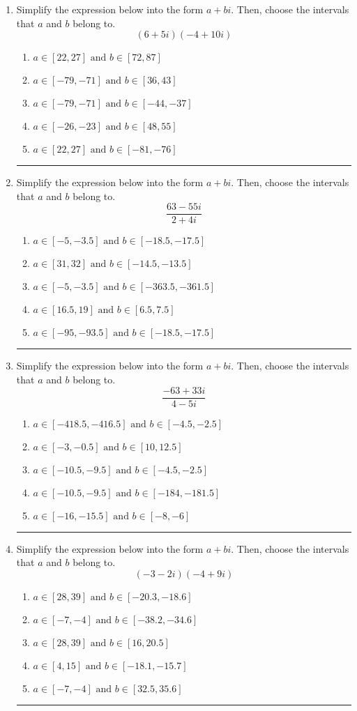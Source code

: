 \documentclass[14pt]{extbook}
\newcommand{\litem}[1]{\item#1\hspace*{-1cm}\rule{\textwidth}{0.4pt}}
\begin{document}
\begin{enumerate}
\litem{
Simplify the expression below into the form $a+bi$. Then, choose the intervals that $a$ and $b$ belong to.\[ (6 + 5 i)(-4 + 10 i) \]\begin{enumerate}[label=\Alph*.]
\item \( a \in [22, 27] \text{ and } b \in [72, 87] \)
\item \( a \in [-79, -71] \text{ and } b \in [36, 43] \)
\item \( a \in [-79, -71] \text{ and } b \in [-44, -37] \)
\item \( a \in [-26, -23] \text{ and } b \in [48, 55] \)
\item \( a \in [22, 27] \text{ and } b \in [-81, -76] \)

\end{enumerate} }
\litem{
Simplify the expression below into the form $a+bi$. Then, choose the intervals that $a$ and $b$ belong to.\[ \frac{63 - 55 i}{2 + 4 i} \]\begin{enumerate}[label=\Alph*.]
\item \( a \in [-5, -3.5] \text{ and } b \in [-18.5, -17.5] \)
\item \( a \in [31, 32] \text{ and } b \in [-14.5, -13.5] \)
\item \( a \in [-5, -3.5] \text{ and } b \in [-363.5, -361.5] \)
\item \( a \in [16.5, 19] \text{ and } b \in [6.5, 7.5] \)
\item \( a \in [-95, -93.5] \text{ and } b \in [-18.5, -17.5] \)

\end{enumerate} }
\litem{
Simplify the expression below into the form $a+bi$. Then, choose the intervals that $a$ and $b$ belong to.\[ \frac{-63 + 33 i}{4 - 5 i} \]\begin{enumerate}[label=\Alph*.]
\item \( a \in [-418.5, -416.5] \text{ and } b \in [-4.5, -2.5] \)
\item \( a \in [-3, -0.5] \text{ and } b \in [10, 12.5] \)
\item \( a \in [-10.5, -9.5] \text{ and } b \in [-4.5, -2.5] \)
\item \( a \in [-10.5, -9.5] \text{ and } b \in [-184, -181.5] \)
\item \( a \in [-16, -15.5] \text{ and } b \in [-8, -6] \)

\end{enumerate} }
\litem{
Simplify the expression below into the form $a+bi$. Then, choose the intervals that $a$ and $b$ belong to.\[ (-3 - 2 i)(-4 + 9 i) \]\begin{enumerate}[label=\Alph*.]
\item \( a \in [28, 39] \text{ and } b \in [-20.3, -18.6] \)
\item \( a \in [-7, -4] \text{ and } b \in [-38.2, -34.6] \)
\item \( a \in [28, 39] \text{ and } b \in [16, 20.5] \)
\item \( a \in [4, 15] \text{ and } b \in [-18.1, -15.7] \)
\item \( a \in [-7, -4] \text{ and } b \in [32.5, 35.6] \)

\end{enumerate} }
\end{enumerate}
\end{document}
